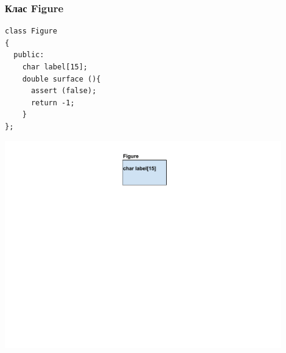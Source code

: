 \documentclass{beamer}
\begin{document}
\begin{frame}[fragile]
\frametitle{Клас Figure}


\begin{flushleft}
\begin{lstlisting}
class Figure
{
  public:
    char label[15];
    double surface (){
      assert (false);
      return -1;
    }
};
\end{lstlisting}
\end{flushleft}


\begin{center}
\includegraphics[width=12.0cm]{images/inmem_figure}
\end{center}


\end{frame}
\end{document}
